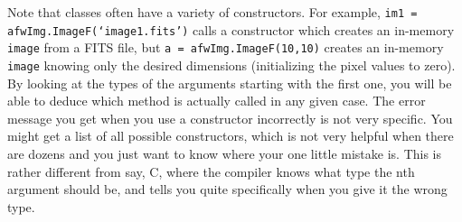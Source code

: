 Note that classes often have a variety of constructors.  For example,
\texttt{im1 = afwImg.ImageF(`image1.fits')} calls a constructor which
creates an in-memory \texttt{image} from a FITS file, but \texttt{a =
  afwImg.ImageF(10,10)} creates an in-memory \texttt{image} knowing
  only the desired dimensions (initializing the pixel values to zero).
  By looking at the types of the arguments starting with the first
  one, you will be able to deduce which method is actually called in
  any given case.  The error message you get when you use a
  constructor incorrectly is not very specific.  You might get a list
  of all possible constructors, which is not very helpful when there
  are dozens and you just want to know where your one little mistake
  is.  This is rather different from say, C, where the compiler knows
  what type the nth argument should be, and tells you quite
  specifically when you give it the wrong type.

